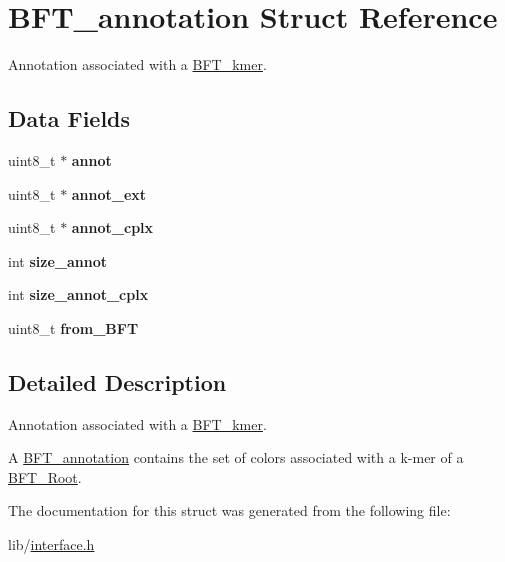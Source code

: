 \hypertarget{structBFT__annotation}{}\section{B\+F\+T\+\_\+annotation Struct Reference}
\label{structBFT__annotation}


Annotation associated with a \hyperlink{structBFT__kmer}{B\+F\+T\+\_\+kmer}.  


\subsection*{Data Fields}
\begin{DoxyCompactItemize}
\item 
\hypertarget{structBFT__annotation_aa286433f7ad06a2e40862186dc93cba4}{}uint8\+\_\+t $\ast$ {\bfseries annot}\label{structBFT__annotation_aa286433f7ad06a2e40862186dc93cba4}

\item 
\hypertarget{structBFT__annotation_affce4cc9bed923fbc5bb884eb4a6798a}{}uint8\+\_\+t $\ast$ {\bfseries annot\+\_\+ext}\label{structBFT__annotation_affce4cc9bed923fbc5bb884eb4a6798a}

\item 
\hypertarget{structBFT__annotation_aa0175d255a5d43991a7a1bd9ca9d3b9f}{}uint8\+\_\+t $\ast$ {\bfseries annot\+\_\+cplx}\label{structBFT__annotation_aa0175d255a5d43991a7a1bd9ca9d3b9f}

\item 
\hypertarget{structBFT__annotation_a811c32fbbd0cecb9fdcc4588016bf170}{}int {\bfseries size\+\_\+annot}\label{structBFT__annotation_a811c32fbbd0cecb9fdcc4588016bf170}

\item 
\hypertarget{structBFT__annotation_ab241457b872fc5d1f082edfc532eccb0}{}int {\bfseries size\+\_\+annot\+\_\+cplx}\label{structBFT__annotation_ab241457b872fc5d1f082edfc532eccb0}

\item 
\hypertarget{structBFT__annotation_ae5b18246fa3dea4abda1f679e46fc03c}{}uint8\+\_\+t {\bfseries from\+\_\+\+B\+F\+T}\label{structBFT__annotation_ae5b18246fa3dea4abda1f679e46fc03c}

\end{DoxyCompactItemize}


\subsection{Detailed Description}
Annotation associated with a \hyperlink{structBFT__kmer}{B\+F\+T\+\_\+kmer}. 

A \hyperlink{structBFT__annotation}{B\+F\+T\+\_\+annotation} contains the set of colors associated with a k-\/mer of a \hyperlink{structBFT__Root}{B\+F\+T\+\_\+\+Root}. 

The documentation for this struct was generated from the following file\+:\begin{DoxyCompactItemize}
\item 
lib/\hyperlink{interface_8h}{interface.\+h}\end{DoxyCompactItemize}
